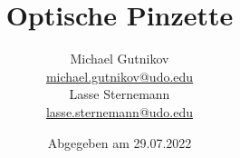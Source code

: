 

\title{Optische Pinzette}
\author{
  Michael Gutnikov\\
  \href{mailto:michael.gutnikov@udo.edu}{michael.gutnikov@udo.edu}\\
  Lasse Sternemann\\
  \href{mailto:lasse.sternemann@udo.edu}{lasse.sternemann@udo.edu}
}
\date{Abgegeben am 29.07.2022}


    \maketitle
    \newpage
    \tableofcontents
    \newpage

    
    


    \newpage
    \printbibliography

